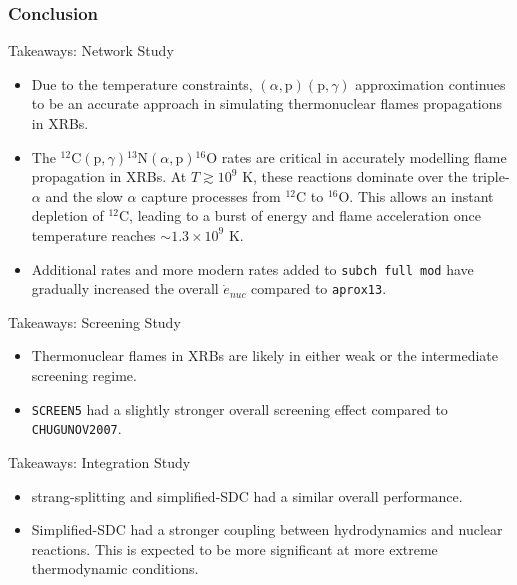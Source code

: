 \documentclass[
	11pt, %
]{beamer}
\begin{document}
\begin{frame}[allowframebreaks]
\frametitle{Conclusion}
    \begin{block}{Takeaways: Network Study}
    \begin{itemize}
        \item  Due to the temperature constraints, $(\alpha, \mbox{p})(\mbox{p}, \gamma)$ approximation continues to be an accurate approach in simulating thermonuclear flames propagations in XRBs. 
        
        \item The ${}^{12}\mbox{C}(\mbox{p}, \gamma) {}^{13}\mbox{N}(\alpha, \mbox{p}){}^{16}\mbox{O}$ rates are critical in accurately modelling flame propagation in XRBs. At $T \gtrsim 10^9$ K, these reactions dominate over the triple-$\alpha$ and the slow $\alpha$ capture processes from ${}^{12}$C to ${}^{16}$O. This allows an instant depletion of ${}^{12}$C, leading to a burst of energy and flame acceleration once temperature reaches $\sim 1.3 \times 10^9$ K.
    
        \item Additional rates and more modern rates added to {\tt subch full mod} have gradually increased the overall $\dot{e}_{nuc}$ compared to {\tt aprox13}.
    \end{itemize}
    \end{block}
    
    \begin{block}{Takeaways: Screening Study}
    \begin{itemize}
        \item Thermonuclear flames in XRBs are likely in either weak or the intermediate screening regime.
        \item {\tt SCREEN5} had a slightly stronger overall screening effect compared to {\tt CHUGUNOV2007}.
    \end{itemize}
    \end{block}
    
    \begin{block}{Takeaways: Integration Study}
    \begin{itemize}
        \item strang-splitting and simplified-SDC had a similar overall performance.
        \item Simplified-SDC had a stronger coupling between hydrodynamics and nuclear reactions. This is expected to be more significant at more extreme thermodynamic conditions.
    \end{itemize}
    \end{block}
\end{frame}
\end{document}
